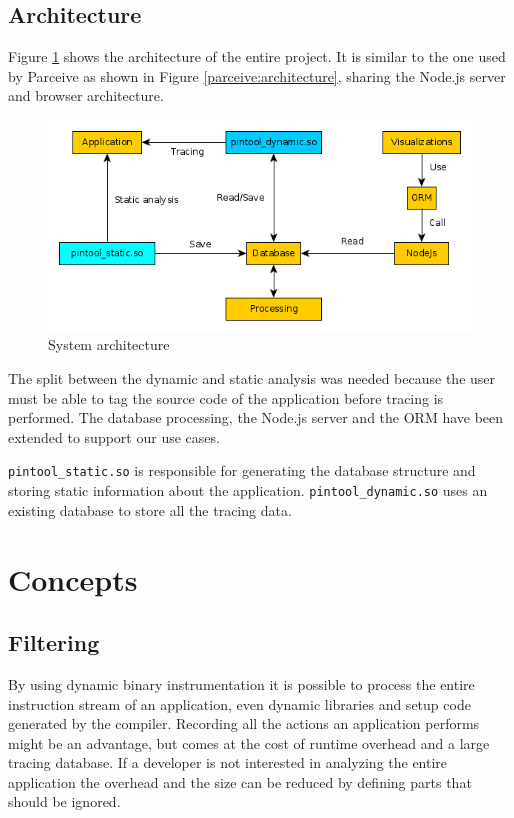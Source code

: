 \subsection{Architecture}

Figure \ref{architecture} shows the architecture of the entire project. It is similar to the one used by Parceive as shown in Figure \ref{parceive:architecture}, sharing the Node.js server and browser architecture.

\begin{figure}
	\centering
	\includegraphics[width=1\textwidth]{architecture}
	\caption{System architecture}
	\label{architecture}
\end{figure}

The split between the dynamic and static analysis was needed because the user must be able to tag the source code of the application before tracing is performed. The database processing, the Node.js server and the ORM have been extended to support our use cases.

\texttt{pintool\_static.so} is responsible for generating the database structure and storing static information about the application. \texttt{pintool\_dynamic.so} uses an existing database to store all the tracing data.

\section{Concepts}

\subsection{Filtering}

By using dynamic binary instrumentation it is possible to process the entire instruction stream of an application, even dynamic libraries and setup code generated by the compiler. Recording all the actions an application performs might be an advantage, but comes at the cost of runtime overhead and a large tracing database. If a developer is not interested in analyzing the entire application the overhead and the size can be reduced by defining parts that should be ignored.

